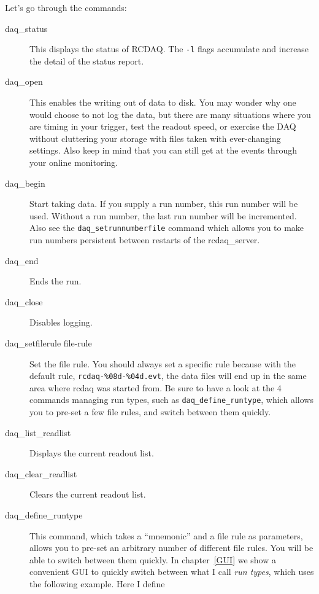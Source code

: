 \documentclass{article}[11pt]
\begin{document}
Let's go through the commands:

\begin{description}


\item[daq\_status] This displays the status of RCDAQ.
  The \verb|-l| flags accumulate and increase the detail of the status
  report.

\item[daq\_open] This enables the writing out of data to disk. You may
  wonder why one would choose to not log the data, but there are many
  situations where you are timing in your trigger, test the readout
  speed, or exercise the DAQ without cluttering your storage with
  files taken with ever-changing settings. Also keep in mind that you
  can still get at the events through your online monitoring.
 
\item[daq\_begin] Start taking data. If you supply a run number,
  this run number will be used.  Without a run number, the last run
  number will be incremented. Also see the \verb|daq_setrunnumberfile|
  command which allows you to make run numbers persistent between
  restarts of the rcdaq\_server.

\item[daq\_end] Ends the run.

\item[daq\_close] Disables logging.

\item[daq\_setfilerule file-rule] Set the file rule. You should always
  set a specific rule because with the default rule,
  \verb|rcdaq-%08d-%04d.evt|, the data files will end up in the same
  area where rcdaq was started from.  Be sure to have a look at the 4 commands
  managing run types, such as \verb|daq_define_runtype|, which allows
  you to pre-set a few file rules, and switch between them quickly.

\item[daq\_list\_readlist] Displays the current readout list.

\item[daq\_clear\_readlist] Clears the current readout list.

\item[daq\_define\_runtype] This command, which takes a
  ``mnemonic'' and a file rule as parameters, allows you to pre-set an
  arbitrary number of different file rules. You will be able to switch
  between them quickly. In chapter~\ref{GUI} we show a convenient GUI
  to quickly switch between what I call \emph{run types}, which uses
  the following example. Here I define


\end{description}
\end{document}

